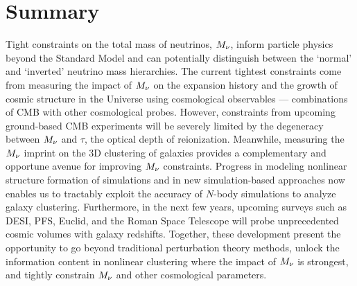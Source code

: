 \section{Summary} \label{sec:summary} 
Tight constraints on the total mass of neutrinos, $M_\nu$, inform particle
physics beyond the Standard Model and can potentially distinguish
between the `normal' and `inverted' neutrino mass hierarchies. The current
tightest constraints 
come from measuring the impact of $M_\nu$ on the expansion history and the 
growth of cosmic structure in the Universe using cosmological observables --- 
combinations of CMB with other cosmological probes. However, constraints from 
upcoming ground-based CMB experiments will be severely limited by the degeneracy
between $M_\nu$ and $\tau$, the optical depth of reionization. Meanwhile, 
measuring the $M_\nu$ imprint on the 3D clustering of galaxies provides a 
complementary and opportune avenue for improving $M_\nu$ constraints. Progress
in modeling nonlinear structure formation of simulations and in new
simulation-based approaches now enables us to tractably exploit the accuracy of
$N$-body simulations to analyze galaxy clustering. Furthermore, in the next few
years, upcoming surveys such as DESI, PFS, Euclid, and the Roman Space Telescope
will probe unprecedented cosmic volumes with galaxy redshifts. Together, these 
development present the opportunity to go beyond traditional perturbation theory methods, unlock the
information content in nonlinear clustering where the impact of $M_\nu$ is
strongest, and tightly constrain $M_\nu$ and other cosmological parameters. 

